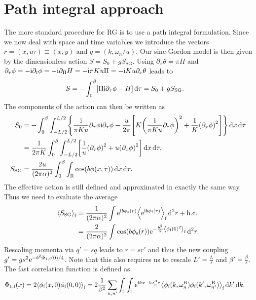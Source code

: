 \documentclass[english, parskip=full]{scrartcl}
\begin{document}
\section{Path integral approach}
The more standard procedure for RG is to use a path integral formulation.
Since we now deal with space and time variables we introduce the vectors $r=(x,u\tau) \equiv (x,y)$ and $q=(k,\omega_n/u)$.
Our sine-Gordon model is then given by the dimensionless action $S=S_0 + gS_\text{SG}$.
Using $\partial_x\theta = \pi \Pi$ and $\partial_\tau \phi = -\text{i}\partial_t\phi = -\text{i}\partial_\Pi H = -\text{i} \pi Ku\Pi = -\text{i} Ku \partial_x\theta$ leads to
\begin{align}
S &= -\intx{0}{\beta}{\klb*{\Pi \i\partial_\tau \phi - H}}{\tau} = S_0 + gS_\text{SG}.
\end{align}
The components of the action can then be written as
\begin{align}
S_0 &= -\intx{0}{\beta}{\intx{-L/2}{L/2}{ \klc*{\frac{\i}{\pi Ku} \partial_\tau \phi \i\partial_\tau \phi - \frac{u}{2\pi}  \klb*{ K \kla*{\frac{\i}{\pi Ku} \partial_\tau\phi}^2 + \frac{1}{K} \kla*{\partial_x\phi}^2 }} }{x}}{\tau}\\
&= \frac{1}{2\pi K} \intx{0}{\beta}{\intx{-L/2}{L/2}{\klb*{\frac{1}{u}\kla*{\partial_\tau \phi}^2 + u \kla*{\partial_x\phi}^2}}{x}}{\tau},\\
S_\text{SG} &= \frac{2u}{(2\pi\alpha)^2} \intx{0}{\beta}{\intr{ \cos\kla*{b\phi(x,\tau)}}{x}}{\tau}.
\end{align}
The effective action is still defined and approximated in exactly the same way.
Thus we need to evaluate the average
\begin{align}
\bra*{S_\text{SG}}_\f &= \frac{1}{(2\pi\alpha)^2} \int \powe{\i b\phi_\s(r)} \bra*{\powe{\i b\phi_\f(r)}}_\f\,\d^2r + \hc\\
&= \frac{2}{(2\pi\alpha)^2} \int \cos\kla*{b\phi_\s(r)} \powe{-\frac{b^2}{2} \bra*{\phi_\f(0)^2}_\f}\,\d^2r.
\end{align}
Rescaling momenta via $q'=sq$ leads to $r=sr'$ and thus the new coupling $g'=g s^2 \text{e}^{-b^2\Phi_{1,\text{f}}(0)/4}$.
Note that this also requires us to rescale $L' = \frac{L}{s}$ and $\beta' = \frac{\beta}{s}$.
The fast correlation function is defined as
\begin{align}
\Phi_{1,\f}(x) &= 2\bra*{\phi_\f(x,0)\phi_\f(0,0)}_\f = 2\frac{1}{\beta^2} \sum_{n,n'} \intx{\f}{ }{\intx{\f}{ }{ \powe{\i kx-\i\omega_n^\B\tau} \bra*{\phi_\f(k,\omega_n^\B) \phi_\f(k',\omega_{n'}^\B)}_\f }{k'}}{k}.
\end{align}
\end{document}
